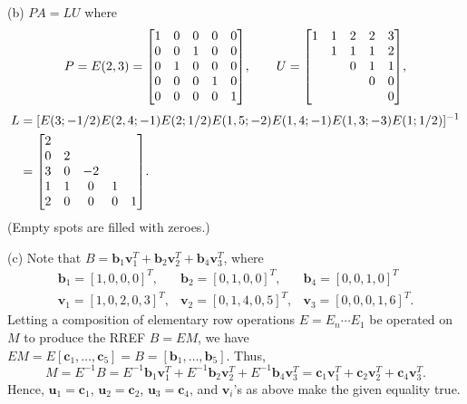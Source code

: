 \documentclass{homework}
\makeatletter
\newenvironment{redmatrix}
  {\left[\array{@{}ccccc@{}}}
  {\endarray\right]}
\makeatother
\begin{document}
{\noindent (b) $PA=LU$ where
$$  P = E(2,3) =
    \begin{redmatrix}
        1&0&0&0&0\\
        0&0&1&0&0\\
        0&1&0&0&0\\
        0&0&0&1&0\\
        0&0&0&0&1\\
    \end{redmatrix}, \qquad U =
    \begin{redmatrix}
        1&1&2&2&3\\
        &1&1&1&2\\
        &&0&1&1\\
        &&&0&0\\
        &&&&0\\
    \end{redmatrix},$$
\begin{align*}
    L & = [E(3;-1/2)E(2,4;-1)E(2;1/2)E(1,5;-2)E(1,4;-1)E(1,3;-3)E(1;1/2)]^{-1}
    \\ &=
    \begin{redmatrix}
        2&&&&\\
        0&2\\
        3&0&-2\\
        1&1&0&1\\
        2&0&0&0&1
    \end{redmatrix}.
\end{align*}
(Empty spots are filled with zeroes.)

\noindent(c) Note that $B = \mathbf b_1 \mathbf v_1^T +\mathbf b_2 \mathbf v_2^T +\mathbf b_4 \mathbf v_3^T$, where
\[\begin{array}{lll}
        \mathbf b_1 = [1,0,0,0]^T ,  & \mathbf b_2 = [0,1,0,0]^T,   & \mathbf b_4 = [0,0,1,0]^T    \\
        \mathbf v_1 = [1,0,2,0,3]^T, & \mathbf v_2 = [0,1,4,0,5]^T, & \mathbf v_3 = [0,0,0,1,6]^T.
    \end{array}\]
Letting a composition of elementary row operations $E=E_n\cdots E_1$ be operated on $M$ to produce the RREF $B=EM$, we have $EM = E[\mathbf c_1,\dots,\mathbf c_5] = B = [\mathbf b_1,\dots,\mathbf b_5]$. Thus,
$$ M = E^{-1}B = E^{-1}\mathbf b_1 \mathbf v_1^T +E^{-1}\mathbf b_2 \mathbf v_2^T +E^{-1}\mathbf b_4 \mathbf v_3^T= \mathbf c_1 \mathbf v_1^T +\mathbf c_2 \mathbf v_2^T +\mathbf c_4 \mathbf v_3^T. $$
Hence, $\mathbf u_1 = \mathbf c_1$, $\mathbf u_2 = \mathbf c_2$, $\mathbf u_3 = \mathbf c_4$, and $\mathbf v_i$'s as above make the given equality true.
}
\end{document}
